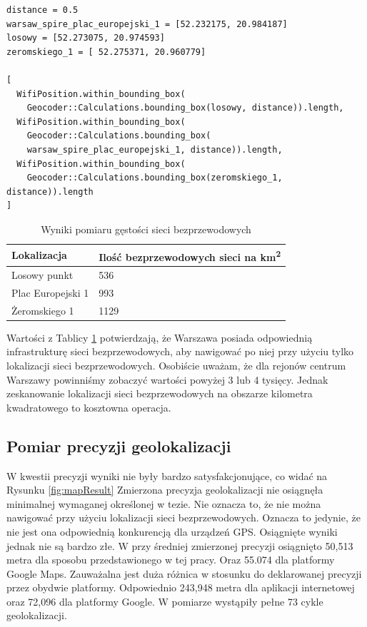 \begin{verbatim}
distance = 0.5
warsaw_spire_plac_europejski_1 = [52.232175, 20.984187]
losowy = [52.273075, 20.974593]
zeromskiego_1 = [ 52.275371, 20.960779]

[
  WifiPosition.within_bounding_box(
    Geocoder::Calculations.bounding_box(losowy, distance)).length,
  WifiPosition.within_bounding_box(
    Geocoder::Calculations.bounding_box(
    warsaw_spire_plac_europejski_1, distance)).length,
  WifiPosition.within_bounding_box(
    Geocoder::Calculations.bounding_box(zeromskiego_1, distance)).length
]
\end{verbatim}

\begin{table}
\caption{Wyniki pomiaru gęstości sieci bezprzewodowych}
\label{table:densityResult}
\begin{tabular} { |l|l|  }
\hline
Lokalizacja & Ilość bezprzewodowych sieci na km\textsuperscript{2} \\
\hline
\hline
Losowy punkt & 536 \\
Plac Europejski 1 & 993 \\
Żeromskiego 1 & 1129 \\
\hline
\end{tabular}
\end{table}

Wartości z Tablicy \ref{table:densityResult} potwierdzają, że Warszawa posiada odpowiednią infrastrukturę sieci bezprzewodowych, aby nawigować po niej przy użyciu tylko lokalizacji sieci bezprzewodowych. Osobiście uważam, że dla rejonów centrum Warszawy powinniśmy zobaczyć wartości powyżej 3 lub 4 tysięcy. Jednak zeskanowanie lokalizacji sieci bezprzewodowych na obszarze kilometra kwadratowego to kosztowna operacja.

\subsection{Pomiar precyzji geolokalizacji}
W kwestii precyzji wyniki nie były bardzo satysfakcjonujące, co widać na Rysunku \ref{fig:mapResult} Zmierzona precyzja geolokalizacji nie osiągnęła minimalnej wymaganej określonej w tezie. Nie oznacza to, że nie można nawigować przy użyciu lokalizacji sieci bezprzewodowych. Oznacza to jedynie, że nie jest ona odpowiednią konkurencją dla urządzeń GPS. Osiągnięte wyniki jednak nie są bardzo złe. W przy średniej zmierzonej precyzji osiągnięto 50,513 metra dla sposobu przedstawionego w tej pracy. Oraz 55.074 dla platformy Google Maps. Zauważalna jest duża różnica w stosunku do deklarowanej precyzji przez obydwie platformy. Odpowiednio 243,948 metra dla aplikacji internetowej oraz 72,096 dla platformy Google. W pomiarze wystąpiły pełne 73 cykle geolokalizacji.

